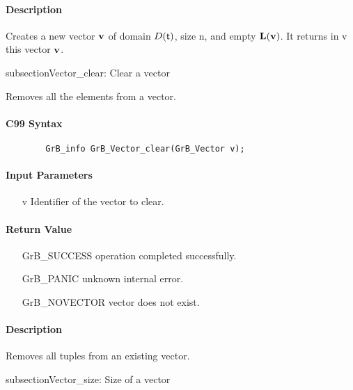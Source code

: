 \paragraph{Description}

Creates a new vector ${\bf v}$ of domain $D({\sf t})$, size {\sf n}, and
empty $\bold{L}({\bf v})$. It returns in {\sf v} this vector ${\bf v}$.

subsection{{\sf Vector\_clear}: Clear a vector}

Removes all the elements from a vector.

\paragraph{C99 Syntax}

\begin{verbatim}
        GrB_info GrB_Vector_clear(GrB_Vector v);
\end{verbatim}

\paragraph{Input Parameters}

\begin{itemize}[leftmargin=1.1in]
    \item[{\sf v}] Identifier of the vector to clear.
\end{itemize}

\paragraph{Return Value}

\begin{itemize}[leftmargin=2.1in]
\item[{\sf GrB\_SUCCESS}]   operation completed successfully.
\item[{\sf GrB\_PANIC}]     unknown internal error.
\item[{\sf GrB\_NOVECTOR}]  vector does not exist.
\end{itemize}

\paragraph{Description}

Removes all tuples from an existing vector.

subsection{{\sf Vector\_size}: Size of a vector}

